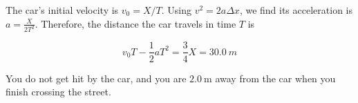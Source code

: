 \begin{solution}
    The car's initial velocity is $v_0 =X/T$. Using $v^2 = 2 a \Delta x$, we find its acceleration is $a=\frac{X}{2T^2}$. Therefore, the distance the car travels in time $T$ is 

    $$v_0 T - \frac{1}{2} a T^2 = \frac{3}{4} X= 30.0 \ m$$

    You do not get hit by the car, and you are $\boxed{2.0 \ \mathrm{m}}$ away from the car when you finish crossing the street.

\end{solution}